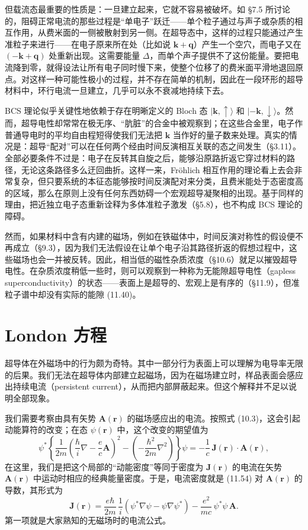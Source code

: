 但载流态最重要的性质是：一旦建立起来，它就不容易被破坏。如 §7.5 所讨论的，阻碍正常电流的那些过程是“单电子”跃迁——单个粒子通过与声子或杂质的相互作用，从费米面的一侧被散射到另一侧。在超导态中，这样的过程只能通过产生准粒子来进行——在电子原来所在处（比如说 $\mathbf{k}+\mathbf{q}$）产生一个空穴，而电子又在 $(-\mathbf{k}+\mathbf{q})$ 处重新出现。这需要能量 $\Delta$，而单个声子提供不了这份能量。要把电流降到零，就得设法让所有电子同时慢下来，使整个位移了的费米面平滑地退回原点。对这样一种可能性极小的过程，并不存在简单的机制，因此在一段环形的超导材料中，环行电流一旦建立，几乎可以永不衰减地持续下去。

BCS 理论似乎关键性地依赖于存在明晰定义的 Bloch 态 $|\mathbf{k},\uparrow\rangle$ 和 $|-\mathbf{k},\downarrow\rangle$。然而，超导电性却常常在极无序、“肮脏”的合金中被观察到；在这些合金里，电子作普通导电时的平均自由程短得使我们无法把 $\mathbf{k}$ 当作好的量子数来处理。真实的情况是：超导“配对”可以在任何两个经由时间反演相互关联的态之间发生（§3.11）。全部必要条件不过是：电子在反转其自旋之后，能够沿原路折返它穿过材料的路径，无论这条路径多么迂回曲折。这样一来，Fröhlich 相互作用的理论看上去会非常复杂，但只要系统的本征态能够按时间反演配对来分类，且费米能处于态密度高的区域，那么在原则上没有任何东西妨碍一个宏观超导凝聚相的出现。基于同样的理由，把近独立电子态重新诠释为多体准粒子激发（§5.8），也不构成 BCS 理论的障碍。

然而，如果材料中含有内建的磁场，例如在铁磁体中，时间反演对称性的假设便不再成立（§9.3），因为我们无法假设在让单个电子沿其路径折返的假想过程中，这些磁场也会一并被反转。因此，相当低的磁性杂质浓度（§10.6）就足以摧毁超导电性。在杂质浓度稍低一些时，则可以观察到一种称为无能隙超导电性（gapless superconductivity）的状态——表面上是超导的、宏观上是有序的（§11.9），但准粒子谱中却没有实际的能隙 (11.40)。

\section{London 方程}

超导体在外磁场中的行为颇为奇特。其中一部分行为表面上可以理解为电导率无限的后果。我们无法在超导体内部建立起磁场，因为在磁场建立时，样品表面会感应出持续电流（persistent current），从而把内部屏蔽起来。但这个解释并不足以说明全部现象。

我们需要考察由具有矢势 $\mathbf{A}(\mathbf{r})$ 的磁场感应出的电流。按照式 (10.3)，这会引起动能算符的改变；在态 $\psi(\mathbf{r})$ 中，这个改变的期望值为
\begin{equation*}
\psi^{*}\left\{\frac{1}{2m}\left(\frac{\hbar}{i}\nabla - \frac{e}{c}\mathbf{A}\right)^{2} - \left(-\frac{\hbar^{2}}{2m}\nabla^{2}\right)\right\}\psi = -\frac{1}{c}\,\mathbf{J}(\mathbf{r})\cdot\mathbf{A}(\mathbf{r}), \tag{11.54}
\end{equation*}
在这里，我们是把这个局部的“动能密度”等同于密度为 $\mathbf{J}(\mathbf{r})$ 的电流在矢势 $\mathbf{A}(\mathbf{r})$ 中运动时相应的经典能量密度。于是，电流密度就是 (11.54) 对 $\mathbf{A}(\mathbf{r})$ 的导数，其形式为
\begin{equation*}
\mathbf{J}(\mathbf{r}) = \frac{e\hbar}{2m}\,\frac{1}{i}\left(\psi^{*}\nabla\psi - \psi\nabla\psi^{*}\right) - \frac{e^{2}}{mc}\,\psi^{*}\psi\,\mathbf{A}. \tag{11.55}
\end{equation*}
第一项就是大家熟知的无磁场时的电流公式。


